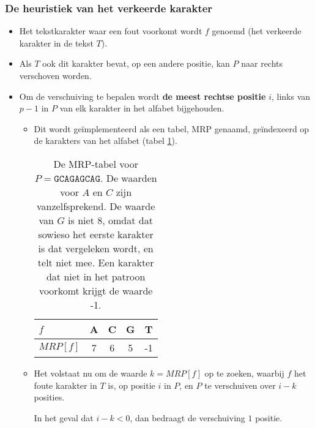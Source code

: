 \subsubsection{De heuristiek van het verkeerde karakter}
\begin{itemize}
    \item Het tekstkarakter waar een fout voorkomt wordt $f$ genoemd (het verkeerde karakter in de tekst $T$).
    \item Als $T$ ook dit karakter bevat, op een andere positie, kan $P$ naar rechts verschoven worden.
    \item Om de verschuiving te bepalen wordt \textbf{de meest rechtse positie} $i$, links van $p - 1$ in $P$ van elk karakter in het alfabet bijgehouden.
    \begin{itemize}
        \item Dit wordt geïmplementeerd als een tabel, MRP genaamd, geïndexeerd op de karakters van het alfabet (tabel \ref{table:bm2}).
        \begin{table}[ht]
            \centering
            \begin{tabular}{l | cccc}
                $f$ & A & C & G & T \\
                \hline
                $MRP[f]$    & 7 & 6 & 5 & -1
            \end{tabular}
            \caption{De MRP-tabel voor $P = \texttt{GCAGAGCAG}$. De waarden voor $A$ en $C$ zijn vanzelfsprekend. De waarde van $G$ is niet 8, omdat dat sowieso het eerste karakter is dat vergeleken wordt, en telt niet mee. Een karakter dat niet in het patroon voorkomt krijgt de waarde -1.}
            \label{table:bm2}
        \end{table}

        \item Het volstaat nu om de waarde $k = MRP[f]$ op te zoeken, waarbij $f$ het foute karakter in $T$ is, op positie $i$ in $P$, en $P$ te verschuiven over $i - k$ posities. 
        \begin{itemize}
            \alert In het geval dat $i - k < 0$, dan bedraagt de verschuiving $1$ positie.
        \end{itemize}
    \end{itemize}


\end{itemize}
